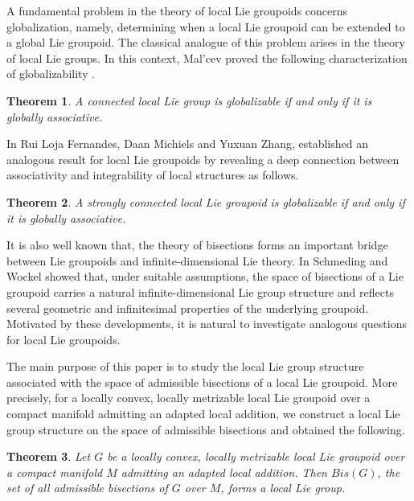 \documentclass[12pt,a4paper]{amsart}
\theoremstyle{plain}
\newtheorem{theorem}{Theorem}[section]
\theoremstyle{definition}
\begin{document}
A fundamental problem in the theory of local Lie groupoids concerns globalization, namely, determining when a local Lie groupoid can be extended to a global Lie groupoid. The classical analogue of this problem arises in the theory of local Lie groups. In this context, Mal'cev proved the following characterization of globalizability \cite{Malcev, Olver}.

\begin{theorem}
    A connected local Lie group is globalizable if and only if it is globally associative.
\end{theorem}



In  \cite{Fernandes,Fernandes2} Rui Loja Fernandes, Daan Michiels and Yuxuan Zhang, established an analogous result for local Lie groupoids by revealing a deep connection between associativity and integrability of local structures as follows.

\begin{theorem}
    A strongly connected local Lie groupoid is globalizable if and only if it is globally associative.
\end{theorem}
      
It is also well known that, the theory of bisections forms an important bridge between Lie groupoids and infinite-dimensional Lie theory. In \cite{Schmeding} Schmeding and Wockel showed that, under suitable assumptions, the space of bisections of a Lie groupoid carries a natural infinite-dimensional Lie group structure and reflects several geometric and infinitesimal properties of the underlying groupoid.  Motivated by these developments, it is natural to investigate analogous questions for local Lie groupoids.

The main purpose of this paper is to study the local Lie group structure associated with the space of admissible bisections of a local Lie groupoid. More precisely, for a locally convex, locally metrizable local Lie groupoid over a compact manifold admitting an adapted local addition, we construct a local Lie group structure on the space of admissible bisections and 
obtained the following.
\begin{theorem}
Let $G$ be a locally convex, locally metrizable local Lie groupoid over a compact manifold $M$ admitting an adapted local addition. Then $Bis(G)$, the set of all admissible bisections of $G$ over $M$, forms a local Lie group.
\end{theorem}
\end{document}
